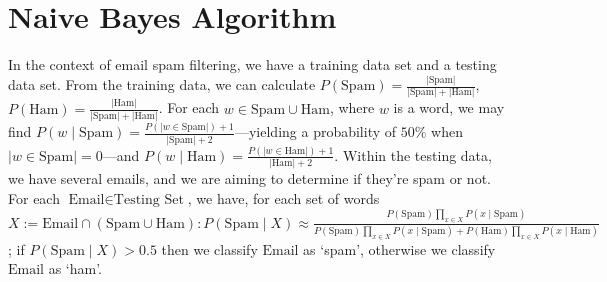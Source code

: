 
\section{Naive Bayes Algorithm}\label{sec:naive_bayes_algorithm}

In the context of email spam filtering, we have a training data set and a testing data set. From the training data, we can calculate $P(\text{Spam}) = \frac{|\text{Spam}|}{|\text{Spam}| + |\text{Ham}|}$, $P(\text{Ham}) = \frac{|\text{Ham}|}{|\text{Spam}| + |\text{Ham}|}$. For each $w \in \text{Spam} \cup \text{Ham}$, where $w$ is a word, we may find $P(w \mid \text{Spam}) = \frac{P(|w \in \text{Spam}|) + 1}{|\text{Spam}| + 2}$---yielding a probability of $50\%$ when $|w \in \text{Spam}| = 0$---and $P(w \mid \text{Ham}) = \frac{P(|w \in \text{Ham}|) + 1}{|\text{Ham}| + 2}$. Within the testing data, we have several emails, and we are aiming to determine if they're spam or not. For each $\text{Email} \in \text{Testing Set}$, we have, for each set of words $X := \text{Email} \cap (\text{Spam} \cup \text{Ham}): P(\text{Spam} \mid X) \approx \frac{P(\text{Spam}) \underset{x \in X}{\prod} P(x \mid \text{Spam})}{P(\text{Spam}) \underset{x \in X}{\prod} P(x \mid \text{Spam}) + P(\text{Ham}) \underset{x \in X}{\prod} P(x \mid \text{Ham})}$; if $P(\text{Spam} \mid X) > 0.5$ then we classify $\text{Email}$ as `spam', otherwise we classify $\text{Email}$ as `ham'.


